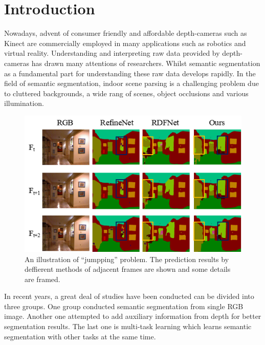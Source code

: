 \section{Introduction}
\label{sec:intro}
Nowadays, advent of consumer friendly and affordable depth-cameras such as Kinect are commercially employed in many applications such as robotics and virtual reality.
%
Understanding and interpreting raw data provided by depth-cameras has drawn many attentions of researchers.
%
Whilst semantic segmentation as a fundamental part for understanding these raw data develops rapidly.
%
In the field of semantic segmentation, indoor scene parsing is a challenging problem due to cluttered backgrounds, a wide rang of scenes, object occlusions and various illumination.

\begin{figure}[htpb]
	\centering
	\includegraphics[scale=0.65]{figure/Consist.png}
	\caption{An illustration of “jumpping” problem. The  prediction results by deffierent methods of adjacent frames are shown and some details are framed.}
	\label{fig:Consist}
\end{figure}


In recent years, a great deal of studies have been conducted can be divided into three groups.
%
One group conducted semantic segmentation from single RGB image.
%
Another one attempted to add auxiliary information from depth for better segmentation results.
%
The last one is multi-task learning which learns semantic segmentation with other tasks at the same time.


